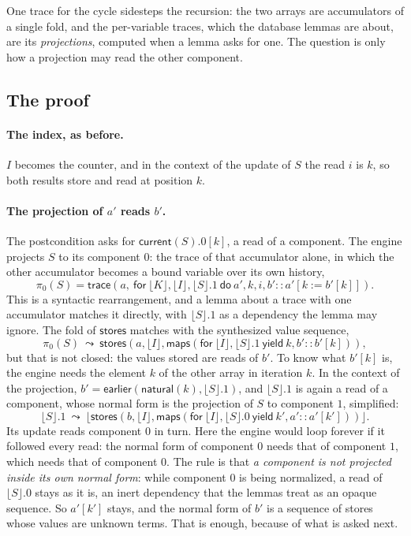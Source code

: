 \documentclass[11pt,a4paper]{article}
\newcommand{\bl}[1]{\lfloor #1\rfloor}                       %
\newcommand{\tr}[3]{\mathsf{trace}(#1,\ \mathsf{for}\ #2\ \mathsf{do}\ #3)}
\newcommand{\mapc}[2]{\mathsf{maps}(\mathsf{for}\ #1\ \mathsf{yield}\ #2)}
\newcommand{\cur}{\mathsf{current}}
\newcommand{\ear}{\mathsf{earlier}}
\newcommand{\natf}{\mathsf{natural}}
\newcommand{\stores}{\mathsf{stores}}
\newcommand{\rw}{\ \leadsto\ }
\begin{document}
One trace for the cycle sidesteps the recursion: the two arrays are accumulators of a single fold, and the
per-variable traces, which the database lemmas are about, are its \emph{projections}, computed when a lemma asks for
one. The question is only how a projection may read the other component.

\subsection{The proof}

\paragraph{The index, as before.} $I$ becomes the counter, and in the context of the update of $S$ the read $i$ is
$k$, so both results store and read at position $k$.

\paragraph{The projection of $a'$ reads $b'$.} The postcondition asks for $\cur(S).0[k]$, a read of a component.
The engine projects $S$ to its component $0$: the trace of that accumulator alone, in which the other accumulator
becomes a bound variable over its own history,
\[
\pi_0(S) = \tr{a}{\bl{K}, \bl{I}, \bl{S}.1}{a', k, i, b' :: a'[k := b'[k]]}.
\]
This is a syntactic rearrangement, and a lemma about a trace with one accumulator matches it directly, with
$\bl{S}.1$ as a dependency the lemma may ignore. The fold of $\stores$ matches with the synthesized value sequence,
\[
\pi_0(S) \rw \stores(a, \bl{I}, \mapc{\bl{I}, \bl{S}.1}{k, b' :: b'[k]}),
\]
but that is not closed: the values stored are reads of $b'$. To know what $b'[k]$ is, the engine needs the element
$k$ of the other array in iteration $k$. In the context of the projection, $b' = \ear(\natf(k), \bl{S}.1)$, and
$\bl{S}.1$ is again a read of a component, whose normal form is the projection of $S$ to component $1$, simplified:
\[
\bl{S}.1 \rw \bl{\stores(b, \bl{I}, \mapc{\bl{I}, \bl{S}.0}{k', a' :: a'[k']})}.
\]
Its update reads component $0$ in turn. Here the engine would loop forever if it followed every read: the normal
form of component $0$ needs that of component $1$, which needs that of component $0$. The rule is that \emph{a
component is not projected inside its own normal form}: while component $0$ is being normalized, a read of $\bl{S}.0$
stays as it is, an inert dependency that the lemmas treat as an opaque sequence. So $a'[k']$ stays, and the normal
form of $b'$ is a sequence of stores whose values are unknown terms. That is enough, because of what is asked next.
\end{document}
